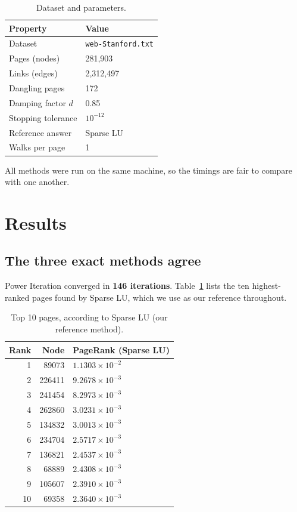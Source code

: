 \documentclass[11pt,a4paper]{article}
\newcommand{\code}[1]{\texttt{\small #1}}
\begin{document}
\begin{table}[H]
\centering
\caption{Dataset and parameters.}
\begin{tabular}{ll}
\toprule
\textbf{Property} & \textbf{Value} \\
\midrule
Dataset          & \code{web-Stanford.txt} \\
Pages (nodes)    & 281{,}903 \\
Links (edges)    & 2{,}312{,}497 \\
Dangling pages   & 172 \\
Damping factor $d$ & 0.85 \\
Stopping tolerance & $10^{-12}$ \\
Reference answer & Sparse LU \\
Walks per page   & 1 \\
\bottomrule
\end{tabular}
\end{table}

All methods were run on the same machine, so the timings are fair to compare with one
another.

\section{Results}

\subsection{The three exact methods agree}

Power Iteration converged in \textbf{146 iterations}. Table~\ref{tab:top10} lists the
ten highest-ranked pages found by Sparse LU, which we use as our reference
throughout.

\begin{table}[H]
\centering
\caption{Top 10 pages, according to Sparse LU (our reference method).}
\label{tab:top10}
\begin{tabular}{rrl}
\toprule
\textbf{Rank} & \textbf{Node} & \textbf{PageRank (Sparse LU)} \\
\midrule
1  & 89073 & $1.1303\times10^{-2}$ \\
2  & 226411 & $9.2678\times10^{-3}$ \\
3  & 241454 & $8.2973\times10^{-3}$ \\
4  & 262860 & $3.0231\times10^{-3}$ \\
5  & 134832 & $3.0013\times10^{-3}$ \\
6  & 234704 & $2.5717\times10^{-3}$ \\
7  & 136821 & $2.4537\times10^{-3}$ \\
8  & 68889 & $2.4308\times10^{-3}$ \\
9  & 105607 & $2.3910\times10^{-3}$ \\
10  & 69358 & $2.3640\times10^{-3}$ \\
\bottomrule
\end{tabular}
\end{table}
\end{document}
